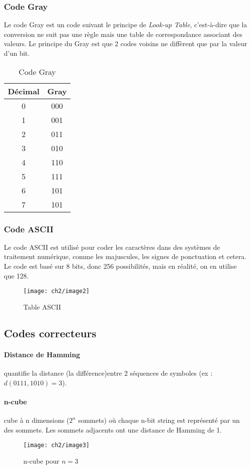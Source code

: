 \subsubsection{Code Gray}
Le code Gray est un code suivant le principe de \textit{Look-up Table}, c'est-à-dire que la conversion ne suit pas une règle mais une table de correspondance associant des valeurs. Le principe du Gray est que 2 codes voisins ne diffèrent que par la valeur d'un bit.
\begin{table}[H]
	\centering
	\begin{tabular}{c|c}
		Décimal & Gray \\
		\hline
		0 & 000\\
		 \hline
		1 & 001\\
		 \hline
		2 & 011\\
		 \hline
		3 & 010\\
		 \hline
		4 & 110\\
		 \hline
		5 & 111\\
		 \hline
		6 & 101\\
		 \hline
		7 & 101		 
	\end{tabular}
	\caption{Code Gray}
\end{table}
\subsubsection{Code ASCII}
Le code ASCII est utilisé pour coder les caractères dans des systèmes de traitement numérique, comme les majuscules, les signes de ponctuation et cetera. Le code est basé sur 8 bits, donc 256 possibilités, mais en réalité, on en utilise que 128.
\begin{figure}[H]
	\centering
	\texttt{[image: ch2/image2]}
	\caption{Table ASCII}
\end{figure}
\subsection{Codes correcteurs}
\paragraph{Distance de Hamming} quantifie la distance (la différence)entre 2 séquences de symboles (ex : $d(0111,1010)=3$).
\paragraph{n-cube} cube à n dimensions ($2^n$ sommets) où chaque n-bit string est représenté par un des sommets. Les sommets adjacents ont une distance de Hamming de 1.
\begin{figure}[H]
	\centering
	\texttt{[image: ch2/image3]}
	\caption{n-cube pour $n=3$}
\end{figure}
